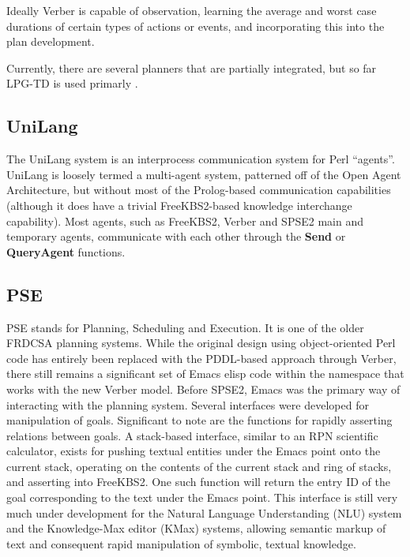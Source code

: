 \documentclass[letterpaper]{article}
\begin{document}
Ideally Verber is capable of observation, learning the average and
worst case durations of certain types of actions or events, and
incorporating this into the plan development.

Currently, there are several planners that are partially integrated,
but so far LPG-TD is used primarly \cite{gerevini2004}.

\subsection{UniLang}

\noindent The UniLang system is an interprocess communication system
for Perl ``agents''.  UniLang is loosely termed a multi-agent system,
patterned off of the Open Agent Architecture, but without most of the
Prolog-based communication capabilities (although it does have a
trivial FreeKBS2-based knowledge interchange capability).  Most agents,
such as FreeKBS2, Verber and SPSE2 main and temporary agents,
communicate with each other through the {\bf Send} or {\bf QueryAgent}
functions.

\subsection{PSE}

\noindent PSE stands for Planning, Scheduling and Execution.  It is
one of the older FRDCSA planning systems.  While the original design
using object-oriented Perl code has entirely been replaced with the
PDDL-based approach through Verber, there still remains a significant
set of Emacs elisp code within the namespace that works with the new
Verber model.  Before SPSE2, Emacs was the primary way of interacting
with the planning system.  Several interfaces were developed for
manipulation of goals.  Significant to note are the functions for
rapidly asserting relations between goals.  A stack-based interface,
similar to an RPN scientific calculator, exists for pushing textual
entities under the Emacs point onto the current stack, operating on
the contents of the current stack and ring of stacks, and asserting
into FreeKBS2.  One such function will return the entry ID of the goal
corresponding to the text under the Emacs point.  This interface is
still very much under development for the Natural Language
Understanding (NLU) system and the Knowledge-Max editor (KMax)
systems, allowing semantic markup of text and consequent rapid
manipulation of symbolic, textual knowledge.
\end{document}
